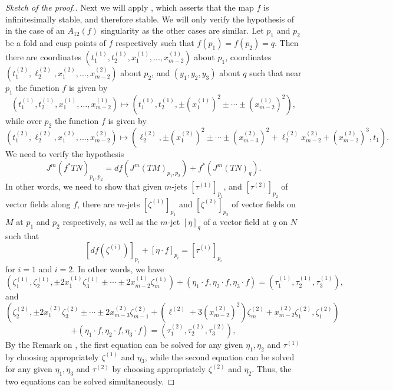 \documentclass[12pt]{amsart}
\theoremstyle{definition}
\begin{document}
\begin{proof}[Sketch of the proof.]
Next we will apply \cite[Chapter V, Theorem 1.4]{GG}, which asserts that the map $f$ is infinitesimally stable, and therefore stable. We will only verify the hypothesis of \cite[Chapter V, Theorem 1.4]{GG} in the case of an $A_{12}(f)$ singularity as the other cases are similar. Let $p_1$ and $p_2$ be a fold and cusp points of $f$ respectively such that $f(p_1)=f(p_2)=q$. 
Then there are coordinates $(t_1^{(1)}, t_2^{(1)}, x_1^{(1)}, ..., x_{m-2}^{(1)})$ about $p_1$, coordinates $(t_1^{(2)}, \ell_2^{(2)}, x_1^{(2)}, ..., x_{m-2}^{(2)})$ about $p_2$, and $(y_1, y_2, y_3)$ about $q$ such that near $p_1$ the function $f$ is given by 
\[
(t_1^{(1)}, t_2^{(1)}, x_1^{(1)}, ..., x_{m-2}^{(1)}) \mapsto  (t_1^{(1)}, t_2^{(1)},  \pm (x_1^{(1)})^2 \pm \cdots \pm (x^{(1)}_{m-2})^2),
\] 
while over $p_2$ the function $f$ is given by
\[
(t_1^{(2)}, \ell_2^{(2)}, x_1^{(2)}, ..., x_{m-2}^{(2)}) \mapsto (\ell_2^{(2)}, \pm (x_1^{(2)})^2 \pm \cdots \pm (x_{m-3}^{(2)})^2 + \ell_2^{(2)} x^{(2)}_{m-2} + (x^{(2)}_{m-2})^3, t_1).
\] 
We need to verify the hypothesis
\[
     J^m(f^*TN)_{p_1, p_2}= df(J^m(TM)_{p_1, p_2})+ f^*(J^m(TN)_q). 
\]
In other words, we need to show that given $m$-jets $[\tau^{(1)}]_{p_1}$, and $[\tau^{(2)}]_{p_2}$ of vector fields along $f$, there are $m$-jets $[\zeta^{(1)}]_{p_1}$ and $[\zeta^{(2)}]_{p_2}$ of vector fields on $M$ at $p_1$ and $p_2$ respectively, as well as  the $m$-jet $[\eta]_q$ of a vector field at $q$ on $N$ such that 
\[
     [df(\zeta^{(i)})]_{p_i} + [\eta\cdot f]_{p_i} = [\tau^{(i)}]_{p_i}
\]
for $i=1$ and $i=2$. %
In other words, we have 
\[
    (\zeta^{(1)}_1, \zeta^{(1)}_2, \pm 2x_1^{(1)}\zeta^{(1)}_3 \pm \cdots \pm 2x_{m-2}^{(1)}\zeta^{(1)}_m) + (\eta_1\cdot f, \eta_2\cdot f, \eta_3\cdot f)= (\tau^{(1)}_1, \tau^{(1)}_2, \tau^{(1)}_3), 
\]
and
\[
    (\zeta^{(2)}_2, \pm 2x_1^{(2)}\zeta^{(2)}_3 \pm \cdots \pm 2x_{m-3}^{(2)}\zeta^{(2)}_{m-1}+ (\ell^{(2)}+ 3(x^{(2)}_{m-2})^2)\zeta^{(2)}_{m} + x_{m-2}^{(2)}\zeta^{(2)}_1, \zeta^{(2)}_1 ) 
    \]
    \[+ (\eta_1\cdot f, \eta_2\cdot f, \eta_3\cdot f)= (\tau^{(2)}_1, \tau^{(2)}_2, \tau^{(2)}_3), 
\]
By the Remark on \cite[p. 191]{GG}, the first equation can be solved for any given $\eta_1, \eta_2$ and $\tau^{(1)}$ by choosing appropriately $\zeta^{(1)}$ and $\eta_3$, while the second equation can be solved for any given $\eta_1, \eta_3$ and $\tau^{(2)}$ by choosing appropriately $\zeta^{(2)}$ and $\eta_2$. Thus, the two equations can be solved simultaneously. 


\end{proof}
\end{document}
